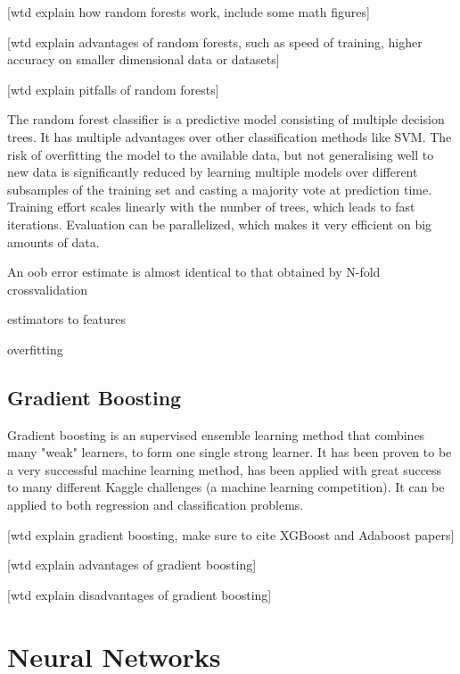 [wtd explain how random forests work, include some math figures]

[wtd explain advantages of random forests, such as speed of training, higher accuracy on smaller dimensional data or datasets]

[wtd explain pitfalls of random forests]


The random forest classifier is a predictive model consisting of multiple decision trees.
It has multiple advantages over other classification methods like SVM.
The risk of overfitting the model to the available data, but not generalising well to new data is significantly reduced by learning multiple models over different subsamples of the training set and casting a majority vote at prediction time. \cite{statisticallearning}
Training effort scales linearly with the number of trees, which leads to fast iterations.
Evaluation can be parallelized, which makes it very efficient on big amounts of data.


An oob error estimate is almost identical to that obtained by N-fold crossvalidation


estimators to features

overfitting



\subsection{Gradient Boosting}

Gradient boosting is an supervised ensemble learning method that combines many "weak" learners, to form one single strong learner.  It has been proven to be a very successful machine learning method, has been applied with great success to many different Kaggle challenges (a machine learning competition).  It can be applied to both regression and classification problems.

[wtd explain gradient boosting, make sure to cite XGBoost and Adaboost papers]

[wtd explain advantages of gradient boosting]

[wtd explain disadvantages of gradient boosting]

\section{Neural Networks}

